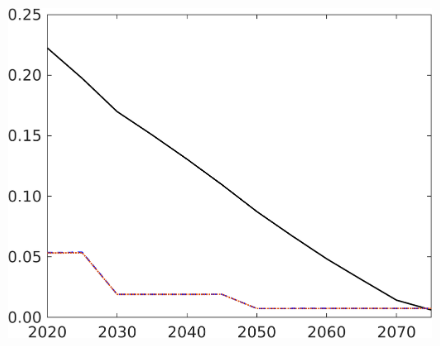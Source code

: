 \begin{figure}[h!!]
\begin{minipage}[]{0.32\textwidth}
	\end{minipage}
	\begin{minipage}[]{0.32\textwidth}
		\includegraphics[width=1\textwidth]{../../codding_model/own_basedOnFried/optimalPol_elastS_DisuSci/figures/all_1705/sff_CompEffOPT_T_NoTaus_spillover0_noskill1_sep1_BN0_ineq0_red0_etaa0.79_lgd0.png}
	\end{minipage}
	\begin{minipage}[]{0.32\textwidth}

\end{minipage}
\end{figure}
